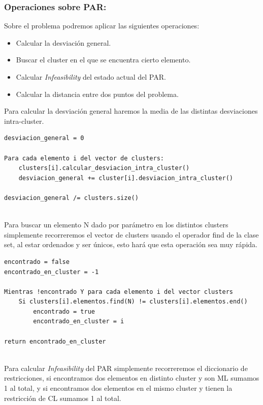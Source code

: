 \documentclass[12pt, spanish]{article}
\begin{document}
\newpage

\subsubsection{Operaciones sobre PAR:}

Sobre el problema podremos aplicar las siguientes operaciones:

\begin{itemize}
	\item {Calcular la desviación general.}
	\item {Buscar el cluster en el que se encuentra cierto elemento.}
	\item {Calcular \textit{Infeasibility} del estado actual del PAR.}
	\item {Calcular la distancia entre dos puntos del problema.}
\end{itemize}

Para calcular la desviación general haremos la media de las distintas desviaciones intra-cluster.


\begin{lstlisting}
desviacion_general = 0
	
Para cada elemento i del vector de clusters:
	clusters[i].calcular_desviacion_intra_cluster()
	desviacion_general += cluster[i].desviacion_intra_cluster()
		
desviacion_general /= clusters.size()	
	
\end{lstlisting}

Para buscar un elemento N dado por parámetro en los distintos clusters simplemente recorreremos el vector de clusters usando el operador find de la clase set, al estar ordenados y ser únicos, esto hará que esta operación sea muy rápida.

\begin{lstlisting}
encontrado = false
encontrado_en_cluster = -1

Mientras !encontrado Y para cada elemento i del vector clusters
	Si clusters[i].elementos.find(N) != clusters[i].elementos.end()
		encontrado = true	
		encontrado_en_cluster = i
		
return encontrado_en_cluster
	
\end{lstlisting}


Para calcular  \textit{Infeasibility} del PAR simplemente recorreremos el diccionario de restricciones, si encontramos dos elementos en distinto cluster y son ML sumamos 1 al total, y si encontramos dos elementos en el mismo cluster y tienen la restricción de CL sumamos 1 al total.
\end{document}
